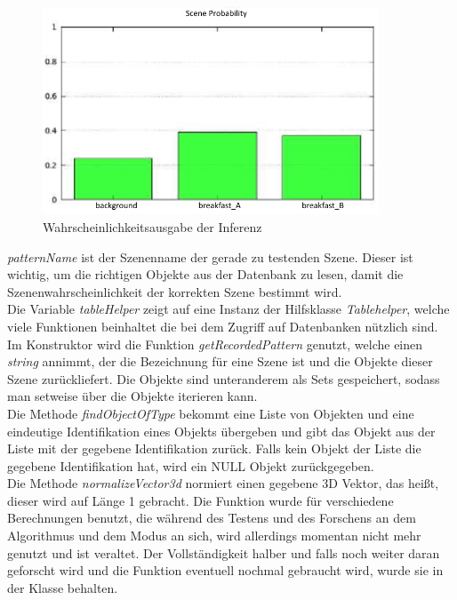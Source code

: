 \begin{figure}
	\centering
	\includegraphics[width=10cm]{bilder/inferencewahrscheinlichkeit.pdf}
	\caption{Wahrscheinlichkeitsausgabe der Inferenz}
	\label{img:inferencewahrscheinlichkeit}
\end{figure}
\textit{patternName} ist der Szenenname der gerade zu testenden Szene. Dieser ist wichtig, um die richtigen Objekte aus der Datenbank zu lesen, damit die Szenenwahrscheinlichkeit der korrekten Szene bestimmt wird.\smallskip\\
Die Variable \textit{tableHelper} zeigt auf eine Instanz der Hilfsklasse \textit{Tablehelper}, welche viele Funktionen beinhaltet die bei dem Zugriff auf Datenbanken nützlich sind. Im Konstruktor wird die Funktion \textit{getRecordedPattern} genutzt, welche einen \textit{string} annimmt, der die Bezeichnung für eine Szene ist und die Objekte dieser Szene zurückliefert. Die Objekte sind unteranderem als Sets gespeichert, sodass man setweise über die Objekte iterieren kann.\smallskip\\
Die Methode \textit{findObjectOfType} bekommt eine Liste von Objekten und eine eindeutige Identifikation eines Objekts übergeben und gibt das Objekt aus der Liste mit der gegebene Identifikation zurück. Falls kein Objekt der Liste die gegebene Identifikation hat, wird ein NULL Objekt zurückgegeben.\smallskip\\
Die Methode \textit{normalizeVector3d} normiert einen gegebene 3D Vektor, das heißt, dieser wird auf Länge 1 gebracht. Die Funktion wurde für verschiedene Berechnungen benutzt, die während des Testens und des Forschens an dem Algorithmus und dem Modus an sich, wird allerdings momentan nicht mehr genutzt und ist veraltet. Der Vollständigkeit halber und falls noch weiter daran geforscht wird und die Funktion eventuell nochmal gebraucht wird, wurde sie in der Klasse behalten.\smallskip\\
